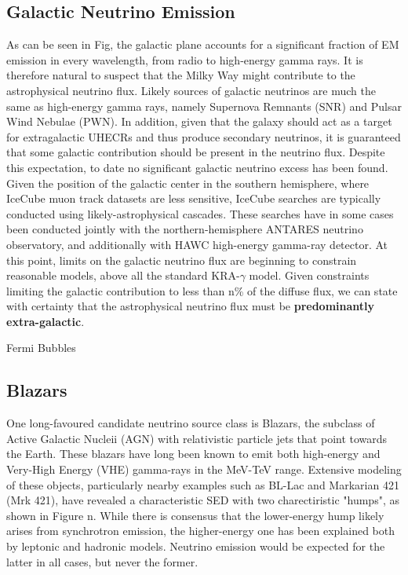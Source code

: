 \documentclass[]{article}
\begin{document}
\subsection{Galactic Neutrino Emission}

As can be seen in Fig, the galactic plane accounts for a significant fraction of EM emission in every wavelength, from radio to high-energy gamma rays. It is therefore natural to suspect that the Milky Way might contribute to the astrophysical neutrino flux. Likely sources of galactic neutrinos are much the same as high-energy gamma rays, namely Supernova Remnants (SNR) and Pulsar Wind Nebulae (PWN). In addition, given that the galaxy should act as a target for extragalactic UHECRs and thus produce secondary neutrinos, it is guaranteed that some galactic contribution should be present in the neutrino flux. Despite this expectation, to date no significant galactic neutrino excess has been found. Given the position of the galactic center in the southern hemisphere, where IceCube muon track datasets are less sensitive, IceCube searches are typically conducted using likely-astrophysical cascades. These searches have in some cases been conducted jointly with the northern-hemisphere ANTARES neutrino observatory, and additionally with HAWC high-energy gamma-ray detector. At this point, limits on the galactic neutrino flux are beginning to constrain reasonable models, above all the standard KRA-$\gamma$ model. Given constraints limiting the galactic contribution to less than n\% of the diffuse flux, we can state with certainty that the astrophysical neutrino flux must be \textbf{predominantly extra-galactic}. 

Fermi Bubbles

\subsection{Blazars}
One long-favoured candidate neutrino source class is Blazars, the subclass of Active Galactic Nucleii (AGN) with relativistic particle jets that point towards the Earth. These blazars have long been known to emit both high-energy  and Very-High Energy (VHE) gamma-rays in the MeV-TeV range. Extensive modeling of these objects, particularly nearby examples such as BL-Lac and Markarian 421 (Mrk 421), have revealed a characteristic SED with two charectiristic "humps", as shown in Figure n. While there is consensus that the lower-energy hump likely arises from synchrotron emission,  the higher-energy one has been explained both by leptonic and hadronic models. Neutrino emission would be expected for the latter in all cases, but never the former.
\end{document}

